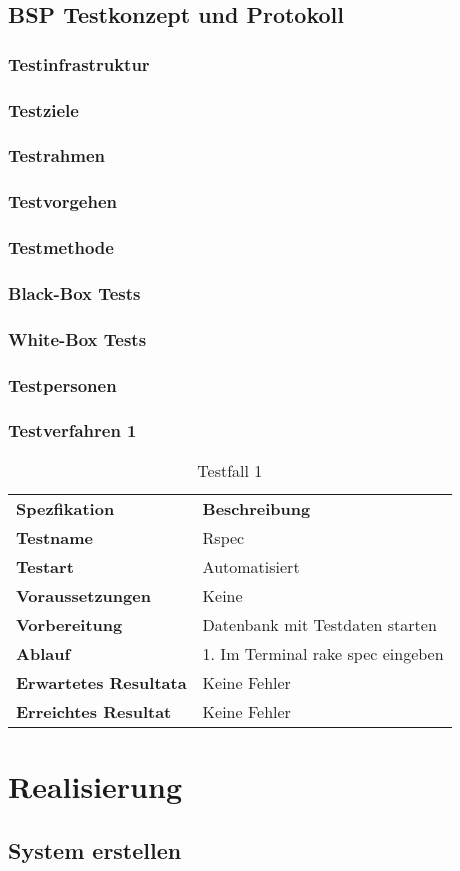 \section{BSP Testkonzept und Protokoll}
\subsection{Testinfrastruktur}
\subsection{Testziele}
\subsection{Testrahmen}
\subsection{Testvorgehen}
\subsection{Testmethode}
\subsection{Black-Box Tests}
\subsection{White-Box Tests}
\subsection{Testpersonen}
\subsection{Testverfahren 1}
\begin{table}[H]
    \begin{tabular}{|l|l|}
        \hline
        \rowcolor{puzzleblue} \multicolumn{2}{|l|}{Testfall Nr. 1}  \\[10pt]
        \hline
        \textbf{Spezfikation} & \textbf{Beschreibung} \\
        \hline
        \rowcolor{puzzleblue!25}\textbf{Testname} & Rspec \\
        \hline
        \textbf{Testart} & Automatisiert \\
        \hline
        \rowcolor{puzzleblue!25}\textbf{Voraussetzungen} & Keine \\
        \hline
        \textbf{Vorbereitung} & Datenbank mit Testdaten starten \\
        \hline
        \rowcolor{puzzleblue!25}\textbf{Ablauf} & 1. Im Terminal rake spec eingeben \\
        \hline
        \textbf{Erwartetes Resultata} & Keine Fehler \\
        \hline
        \rowcolor{puzzleblue!25}\textbf{Erreichtes Resultat} & Keine Fehler \\
        \hline
    \end{tabular}
    \caption{Testfall 1}
\end{table}
\chapter{Realisierung}
\section{System erstellen}
